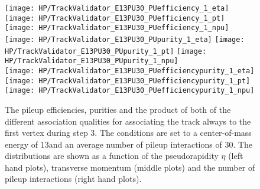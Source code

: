 \begin{figure}[h!t]
  \centering
  \texttt{[image: HP/TrackValidator\_E13PU30\_PUefficiency\_1\_eta]}
  \texttt{[image: HP/TrackValidator\_E13PU30\_PUefficiency\_1\_pt]}
  \texttt{[image: HP/TrackValidator\_E13PU30\_PUefficiency\_1\_npu]}
   \\
  \texttt{[image: HP/TrackValidator\_E13PU30\_PUpurity\_1\_eta]}
  \texttt{[image: HP/TrackValidator\_E13PU30\_PUpurity\_1\_pt]}
  \texttt{[image: HP/TrackValidator\_E13PU30\_PUpurity\_1\_npu]}
   \\
  \texttt{[image: HP/TrackValidator\_E13PU30\_PUefficiencypurity\_1\_eta]}
  \texttt{[image: HP/TrackValidator\_E13PU30\_PUefficiencypurity\_1\_pt]}
  \texttt{[image: HP/TrackValidator\_E13PU30\_PUefficiencypurity\_1\_npu]}
  \caption[Pileup efficiencies, purities and their product of the different qualities of the association map with associating the track to the first vertex always during step 3 with 13\TeV and PU=30]{The pileup efficiencies, purities and the product of both of the different association qualities for associating the track always to the first vertex during step 3. The conditions are set to a center-of-mass energy of 13\TeV and an average number of pileup interactions of 30. The distributions are shown as a function of the pseudorapidity $\eta$ (left hand plots), transverse momentum (middle plots) and the number of pileup interactions (right hand plots). \label{plot:HPUTAE13PU30ZtomumuQualPU1}}
\end{figure}


